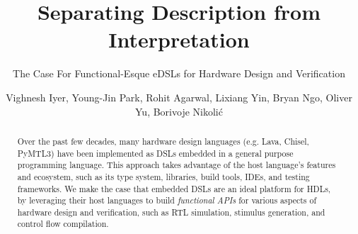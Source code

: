 \documentclass[sigplan,review,nonacm,9pt]{acmart}
\begin{document}
\title{Separating Description from Interpretation}
\subtitle{The Case For Functional-Esque eDSLs for Hardware Design and Verification}


\author{Vighnesh Iyer, Young-Jin Park, Rohit Agarwal, Lixiang Yin, Bryan Ngo, Oliver Yu, Borivoje Nikolić}





\begin{abstract}
Over the past few decades, many hardware design languages (e.g. Lava\cite{lava}, Chisel\cite{chisel}, PyMTL3\cite{pymtl3}) have been implemented as DSLs embedded in a general purpose programming language.
This approach takes advantage of the host language's features and ecosystem, such as its type system, libraries, build tools, IDEs, and testing frameworks.
We make the case that embedded DSLs are an ideal platform for HDLs, by leveraging their host languages to build \textit{functional APIs} for various aspects of hardware design and verification, such as RTL simulation, stimulus generation, and control flow compilation.
\end{abstract}
\end{document}
